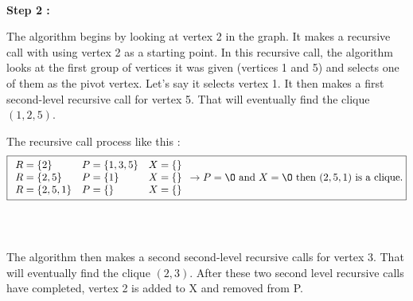 \\
\hspace*{1cm}  \textbf{Step 2 :}
\\
\begin{minipage}{0.4\textwidth}
\end{minipage}
\begin{minipage}{0.6\textwidth}
    The algorithm begins by looking at vertex 2 in the graph. It makes a recursive call with using vertex 2 as a starting point. In this recursive call, the algorithm looks at the first group of vertices it was given (vertices 1 and 5) and selects one of them as the pivot vertex. Let's say it selects vertex 1. It then makes a first second-level recursive call for vertex 5. That will eventually find the clique $(1,2,5)$.
\end{minipage}
The recursive call process like this  :
$$ \boxed{
        \begin{array}{lll}
            R = \{2\}     & P = \{1,3,5\} & X = \{\} \\
            R = \{2,5\}   & P = \{1\}     & X = \{\} \\
            R = \{2,5,1\} & P = \{\}      & X = \{\} \\
        \end{array}
        \rightarrow P = \O \text{ and } X = \O \text{ then } (2,5,1) \text{ is a clique.}
    }$$
\\
\\
\begin{minipage}{0.4\textwidth}
\end{minipage}
\begin{minipage}{0.6\textwidth}
    The algorithm then makes a second second-level recursive calls for vertex 3. That will eventually find the clique $(2,3)$. After these two second level recursive calls have completed, vertex 2 is added to X and removed from P.
\end{minipage}
